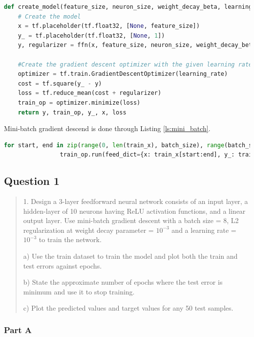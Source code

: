 \begin{lstlisting}[language=Python, caption= loss and weight regularisation functions, label=ls:2_cost]
def create_model(feature_size, neuron_size, weight_decay_beta, learning_rate, layers=3, dropout=False):
    # Create the model
    x = tf.placeholder(tf.float32, [None, feature_size])
    y_ = tf.placeholder(tf.float32, [None, 1])
    y, regularizer = ffn(x, feature_size, neuron_size, weight_decay_beta, layers=layers, dropout=dropout)

    #Create the gradient descent optimizer with the given learning rate.
    optimizer = tf.train.GradientDescentOptimizer(learning_rate)
    cost = tf.square(y_ - y)
    loss = tf.reduce_mean(cost + regularizer)
    train_op = optimizer.minimize(loss)
    return y, train_op, y_, x, loss
\end{lstlisting}

Mini-batch gradient descend is done through Listing \ref{ls:mini_batch}.

\begin{lstlisting}[language=Python, caption= Mini-batch, label=ls:mini_batch]
            for start, end in zip(range(0, len(train_x), batch_size), range(batch_size, len(train_x), batch_size)):
                train_op.run(feed_dict={x: train_x[start:end], y_: train_y[start:end]})
\end{lstlisting}

\subsection{Question 1}
\label{2q1}
\begin{quote}
1. Design a 3-layer feedforward neural network consists of an input layer, a hidden-layer of 10 neurons having ReLU activation functions, and a linear output layer. Use mini-batch gradient descent with a batch size = 8, L2
regularization at weight decay parameter = $10^{-3}$ and a learning rate = $10^{-3}$ to train the network.

a) Use the train dataset to train the model and plot both the train and test errors against epochs.

b) State the approximate number of epochs where the test error is minimum and use it to stop training.

c) Plot the predicted values and target values for any 50 test samples.
\end{quote}
\subsubsection{Part A}

